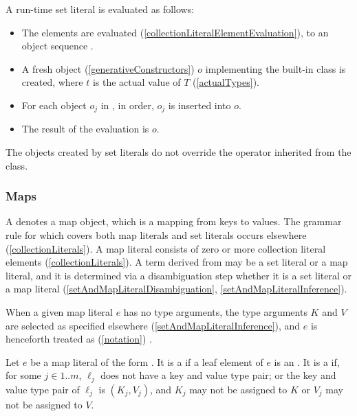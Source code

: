 \documentclass[makeidx]{article}
\begin{document}
{\LMHash{}%
A run-time set literal 
is evaluated as follows:
\begin{itemize}
\item
  The elements  are evaluated
  (\ref{collectionLiteralElementEvaluation}),
  to an object sequence .
\item
  A fresh object (\ref{generativeConstructors}) $o$
  implementing the built-in class  is created,
  where $t$ is the actual value of $T$
  (\ref{actualTypes}).
\item
  For each object $o_j$ in , in order,
  $o_j$ is inserted into $o$.
\item
  The result of the evaluation is $o$.
\end{itemize}

\LMHash{}%
The objects created by set literals do not override
the \lit{==} operator inherited from the  class.


\subsubsection{Maps}

\LMHash{}%
A  denotes a map object,
which is a mapping from keys to values.
The grammar rule for  which covers both
map literals and set literals occurs elsewhere
(\ref{collectionLiterals}).
A map literal consists of zero or more collection literal elements
(\ref{collectionLiterals}).
A term derived from 
may be a set literal or a map literal,
and it is determined via a disambiguation step
whether it is a set literal or a map literal
(\ref{setAndMapLiteralDisambiguation}, \ref{setAndMapLiteralInference}).

\LMHash{}%
When a given map literal $e$ has no type arguments,
the type arguments $K$ and $V$ are selected as specified elsewhere
(\ref{setAndMapLiteralInference}),
and $e$ is henceforth treated as
(\ref{notation})
.


\LMHash{}%
Let $e$ be a map literal of the form
.
It is a  if a leaf element of $e$ is an
.
It is a  if, for some $j \in 1 .. m$,
$\ell_j$ does not have a key and value type pair;
or the key and value type pair of $\ell_j$ is $(K_j, V_j)$,
and $K_j$ may not be assigned to $K$ or
$V_j$ may not be assigned to $V$.

}
\end{document}
